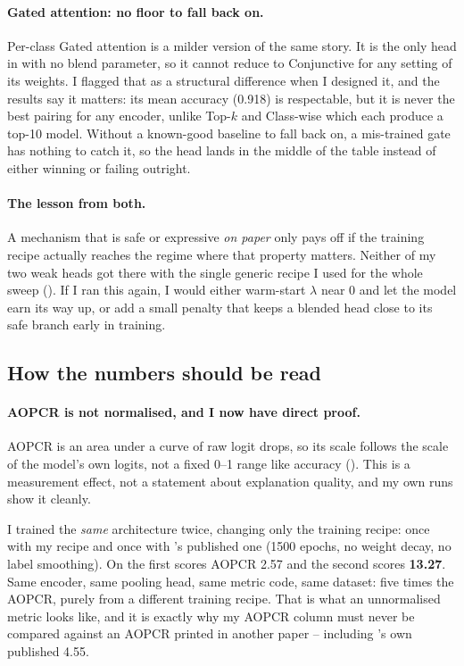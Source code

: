 \paragraph{Gated attention: no floor to fall back on.}
Per-class Gated attention is a milder version of the same story. It is the only head in
 with no blend parameter, so it cannot reduce to Conjunctive for any setting of
its weights. I flagged that as a structural difference when I designed it, and the results say it
matters: its mean \webtraffic{} accuracy (0.918) is respectable, but it is never the best pairing
for any encoder, unlike Top-$k$ and Class-wise which each produce a top-10 model. Without a
known-good baseline to fall back on, a mis-trained gate has nothing to catch it, so the head lands
in the middle of the table instead of either winning or failing outright.

\paragraph{The lesson from both.}
A mechanism that is safe or expressive \emph{on paper} only pays off if the training recipe
actually reaches the regime where that property matters. Neither of my two weak heads got there
with the single generic recipe I used for the whole sweep (). If I ran
this again, I would either warm-start $\lambda$ near 0 and let the model earn its way up, or add a
small penalty that keeps a blended head close to its safe branch early in training.

\subsection{How the numbers should be read}
\label{sec:disc:reading}

\paragraph{AOPCR is not normalised, and I now have direct proof.}
AOPCR is an area under a curve of raw logit drops, so its scale follows the scale of the model's own
logits, not a fixed 0--1 range like accuracy (). This is a measurement
effect, not a statement about explanation quality, and my own runs show it cleanly.

I trained the \emph{same} architecture twice, changing only the training recipe: once with my recipe
and once with \millet{}'s published one (1500 epochs, no weight decay, no label smoothing). On
\webtraffic{} the first scores AOPCR 2.57 and the second scores \textbf{13.27}. Same encoder, same
pooling head, same metric code, same dataset: five times the AOPCR, purely from a different training
recipe. That is what an unnormalised metric looks like, and it is exactly why my AOPCR column must
never be compared against an AOPCR printed in another paper -- including \millet{}'s own published
4.55.

